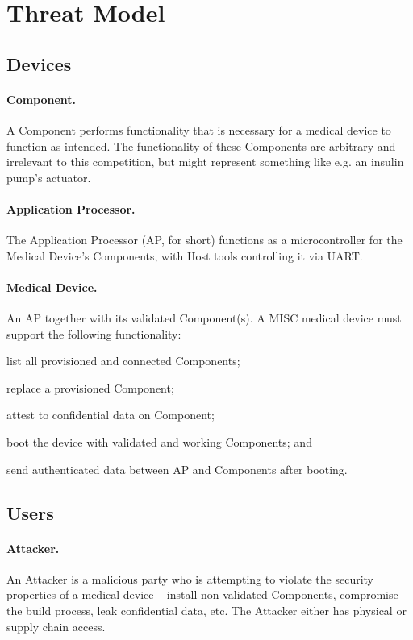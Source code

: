 \section{Threat Model}
\label{sec:threat-model}

\subsection{Devices}

\paragraph{Component.} A Component performs functionality that is necessary for a medical device to function as intended. The functionality of these Components are arbitrary and irrelevant to this competition, but might represent something like e.g. an insulin pump's actuator.

\paragraph{Application Processor.} The Application Processor (AP, for short) functions as a microcontroller for the Medical Device's Components, with Host tools controlling it via UART.

\paragraph{Medical Device.} An AP together with its validated Component(s). A MISC medical device must support the following functionality:
\begin{enumerate*}[label={(\arabic*)}]
    \item list all provisioned and connected Components;
    \item replace a provisioned Component;
    \item attest to confidential data on Component;
    \item boot the device with validated and working Components; and
    \item send authenticated data between AP and Components after booting.
\end{enumerate*}

\subsection{Users}

\paragraph{Attacker.} An Attacker is a malicious party who is attempting to violate the security properties of a medical device -- install non-validated Components, compromise the build process, leak confidential data, etc. The Attacker either has physical or supply chain access.

